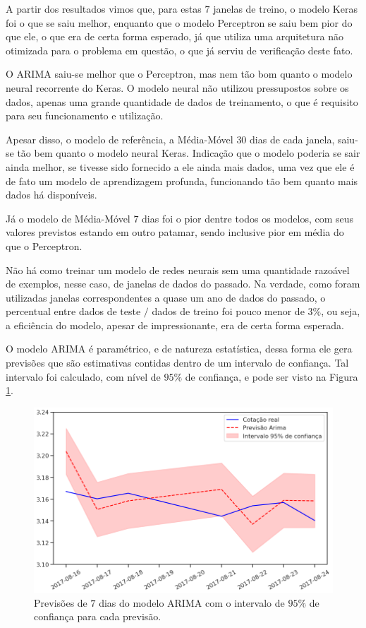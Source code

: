 A partir dos resultados vimos que, para estas $7$ janelas de treino, o modelo Keras foi o que se saiu melhor, enquanto que o modelo Perceptron se saiu bem pior do que ele, o que era de certa forma esperado, já que utiliza uma arquitetura não otimizada para o problema em questão, o que já serviu de verificação deste fato.

O ARIMA saiu-se melhor que o Perceptron, mas nem tão bom quanto o modelo neural recorrente do Keras. O modelo neural não utilizou pressupostos sobre os dados, apenas uma grande quantidade de dados de treinamento, o que é requisito para seu funcionamento e utilização.

Apesar disso, o modelo de referência, a Média-Móvel $30$ dias de cada janela, saiu-se tão bem quanto o modelo neural Keras. Indicação que o modelo poderia se sair ainda melhor, se tivesse sido fornecido a ele ainda mais dados, uma vez que ele é de fato um modelo de aprendizagem profunda, funcionando tão bem quanto mais dados há disponíveis.

Já o modelo de Média-Móvel $7$ dias foi o pior dentre todos os modelos, com seus valores previstos estando em outro patamar, sendo inclusive pior em média do que o Perceptron.

Não há como treinar um modelo de redes neurais sem uma quantidade razoável de exemplos, nesse caso, de janelas de dados do passado. Na verdade, como foram utilizadas janelas correspondentes a quase um ano de dados do passado, o percentual entre dados de teste $/$ dados de treino foi pouco menor de $3\%$, ou seja, a eficiência do modelo, apesar de impressionante, era de certa forma esperada.

O modelo ARIMA é paramétrico, e de natureza estatística, dessa forma ele gera previsões que são estimativas contidas dentro de um intervalo de confiança. Tal intervalo foi calculado, com nível de $95\%$ de confiança, e pode ser visto na Figura \ref{fig:series_previsoes_7_3}.

\begin{figure}[htb]
\centering
\includegraphics[width=14cm]{figuras/series_previsoes_7_3}
\caption{Previsões de $7$ dias do modelo ARIMA com o intervalo de $95\%$ de confiança para cada previsão.}
\label{fig:series_previsoes_7_3}
\end{figure}


